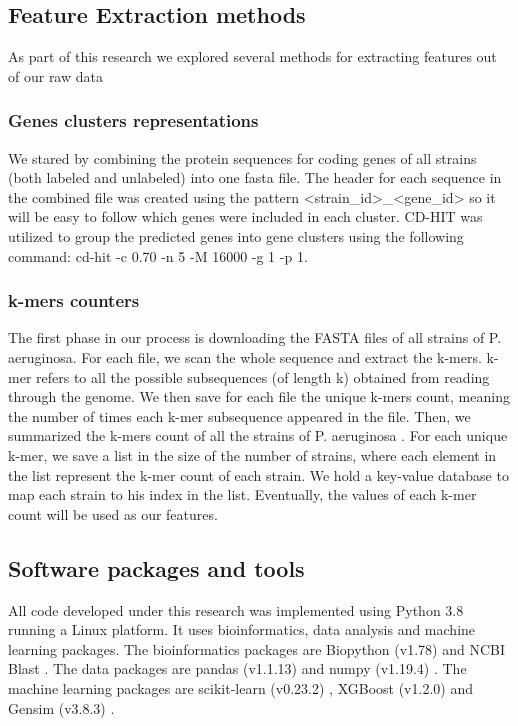 \documentclass{bmcart}
\begin{document}
\subsection{Feature Extraction methods}

As part of this research we explored several methods for extracting 
features out of our raw data

\subsubsection {Genes clusters representations}
We stared by combining the protein sequences for coding genes of all strains (both labeled and unlabeled) into one fasta file. The header for each sequence in the combined file was created using the pattern \textless{}strain\_id\textgreater{}\_\textless{}gene\_id\textgreater{} so it will be easy to follow which genes were included in each cluster.
\newline
CD-HIT was utilized to group the predicted genes into gene clusters using the following command: cd-hit -c 0.70 -n 5 -M 16000 -g 1 -p 1. 


\subsubsection {k-mers counters}
The first phase in our process is downloading the FASTA files of all strains of P. aeruginosa. For each file, we scan the whole sequence and extract the k-mers. k-mer refers to all the possible subsequences (of length k) obtained from reading through the genome. We then save for each file the unique k-mers count, meaning the number of times each k-mer subsequence appeared in the file. Then, we summarized the k-mers count of all the strains of P. aeruginosa . For each unique k-mer, we save a list in the size of the number of strains, where each element in the list represent the k-mer count of each strain. We hold a key-value database to map each strain to his index in the list. Eventually, the values of each k-mer count will be used as our features.



\subsection{Software packages and tools}
All code developed under this research was implemented using Python 3.8 running a Linux platform. It uses bioinformatics, data analysis and machine learning packages. The bioinformatics packages are Biopython (v1.78) \cite{cock2009biopython} and NCBI Blast \cite{altschul1990basic_blast}. The data packages are pandas (v1.1.13) \cite{mckinney2010data_pandas} and numpy (v1.19.4) \cite{oliphant2006guide_numpy}. The machine learning packages are scikit-learn (v0.23.2) \cite{pedregosa2011scikit}, XGBoost (v1.2.0) \cite{xgboost} and Gensim (v3.8.3) \cite{rehurek_lrec}.
\end{document}
